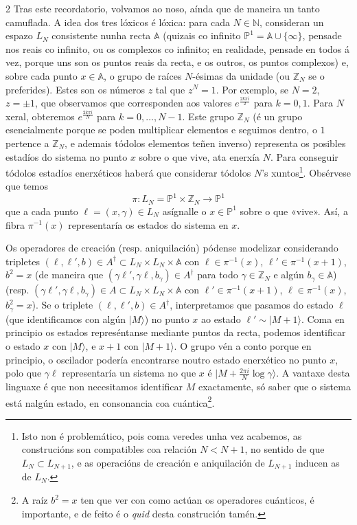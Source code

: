 \begin{multicols}{2}
Tras este recordatorio, volvamos ao noso, aínda que de maneira un tanto
camuflada. A idea dos tres lóxicos é lóxica: para cada $N\in\mathbb{N}$,
consideran un espazo $L_N$ consistente nunha recta $\mathbb{A}$ (quizais co
infinito $\mathbb{P}^1=\mathbb{A}\cup\{\infty\}$, pensade nos reais co
infinito, ou os complexos co infinito; en realidade, pensade en todos á vez,
porque uns son os puntos reais da recta, e os outros, os puntos complexos) e, sobre cada
punto $x\in\mathbb{A}$, o grupo de raíces $N$-ésimas da unidade (ou
$\mathbb{Z}_N$ se o preferides). Estes son os números $z$ tal que $z^N=1$. Por
exemplo, se $N=2$, $z=\pm1$, que observamos que corresponden aos valores
$e^{\frac{2k\pi i}{2}}$ para $k=0,1$. Para $N$ xeral, obteremos $e^{\frac{2k\pi
i}{N}}$ para $k=0,\dots, N-1$. Este grupo $\mathbb{Z}_N$ (é un grupo
esencialmente porque se poden multiplicar elementos e seguimos dentro, o $1$
pertence a $\mathbb{Z}_N$, e ademais tódolos elementos teñen inverso)
representa os posibles estadíos do sistema no punto $x$ sobre o que vive, ata
enerxía $N$. Para conseguir tódolos estadíos enerxéticos haberá que
considerar tódolos $N$'s xuntos\footnote{
Isto non é problemático, pois coma veredes unha vez acabemos, as construcións
son compatibles coa relación $N<N+1$, no sentido de que $L_N \subset L_{N+1}$,
e as operacións de creación e aniquilación de $L_{N+1}$ inducen as de $L_N$.}.
Obsérvese que temos
%
\begin{equation}
    \pi:L_N=\mathbb{P}^1\times\mathbb{Z}_N\longrightarrow \mathbb{P}^1
\end{equation}
%
que a cada punto $\ell=(x,\gamma)\in L_N$ asígnalle o $x\in \mathbb{P}^1$ sobre
o que «vive». Así, a fibra $\pi^{-1}(x)$ representaría os estados do sistema
en $x$.

Os operadores de creación (resp. aniquilación) pódense modelizar considerando
tripletes $(\ell,\ell',b)\in A^\dagger\subset L_N\times L_N\times \mathbb{A}$
con $\ell\in\pi^{-1}(x)$, $\ell'\in\pi^{-1}(x+1)$, $b^2=x$ (de maneira que
$(\gamma\ell',\gamma\ell,b_\gamma)\in A^\dagger$ para todo
$\gamma\in\mathbb{Z}_N$ e algún $b_\gamma\in\mathbb{A}$)  (resp.
$(\gamma\ell',\gamma\ell,b_\gamma)\in A\subset L_N\times L_N\times \mathbb{A}$
con $\ell'\in\pi^{-1}(x+1)$, $\ell\in\pi^{-1}(x)$, $b_\gamma^2=x$). Se o
triplete $(\ell,\ell',b)\in A^\dagger$, interpretamos que
pasamos do estado $\ell$ (que identificamos con algún $|M\rangle$) no punto $x$
ao estado $\ell'\sim|M+1\rangle$.
Coma en principio os estados represéntanse mediante puntos da recta, podemos
identificar o estado $x$ con $|M\rangle$, e $x+1$ con $|M+1\rangle$. O grupo vén
a conto porque en principio, o oscilador podería encontrarse noutro estado
enerxético no punto $x$, polo que $\gamma\ell$ representaría un sistema no
que $x$ é $|M+\frac{2\pi i}{N}\log\gamma\rangle$. A vantaxe desta linguaxe é
que non necesitamos identificar $M$ exactamente, só saber que o sistema está
nalgún estado, en consonancia coa cuántica\footnote{
A raíz $b^2=x$ ten que ver con como actúan os operadores cuánticos, é 
importante, e de feito é o \textit{quid} desta construción tamén.}.


\end{multicols}
